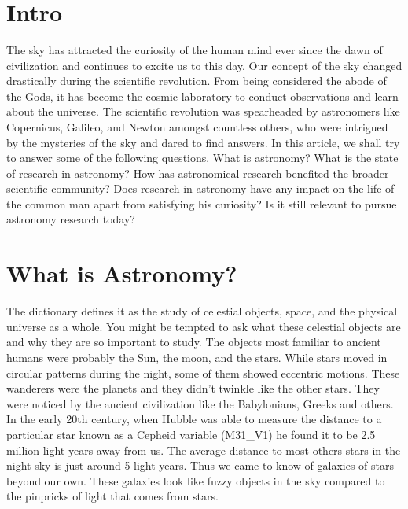\documentclass{../template/texnote}
\title{\textbf{\capitalisewords{Why the Sky is not the Limit for Astronomy Research?}}}
\begin{document}
    \maketitle {}
	\section{Intro}

The sky has attracted the curiosity of the human mind ever since the dawn of civilization and continues to excite us to this day. Our concept of the sky changed drastically during the scientific revolution. From being considered the abode of the Gods, it has become the cosmic laboratory to conduct observations and learn about the universe. 
The scientific revolution was spearheaded by astronomers like Copernicus, Galileo, and Newton amongst countless others, who were intrigued by the mysteries of the sky and dared to find answers. In this article, we shall try to answer some of the following questions. What is astronomy? What is the state of research in astronomy? How has astronomical research benefited the broader scientific community? Does research in astronomy have any impact on the life of the common man apart from satisfying his curiosity? Is it still relevant to pursue astronomy research today?

\section{What is Astronomy?}

The dictionary defines it as the study of celestial objects, space, and the physical universe as a whole. You might be tempted to ask what these celestial objects are and why they are so important to study. The objects most familiar to ancient humans were probably the Sun, the moon, and the stars. While stars moved in circular patterns during the night, some of them showed eccentric motions. These wanderers were the planets and they didn't twinkle like the other stars. They were noticed by the ancient civilization like the Babylonians, Greeks and others. In the early 20th century, when Hubble was able to measure the distance to a particular star known as a Cepheid variable (M31\_V1) he found it to be 2.5 million light years away from us. The average distance to most others stars in the night sky is just around 5 light years. Thus we came to know of galaxies of stars beyond our own. These galaxies look like fuzzy objects in the sky compared to the pinpricks of light that comes from stars.
\end{document}
